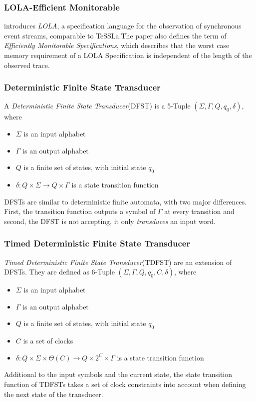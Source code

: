 	\subsubsection{LOLA-Efficient Monitorable}
		\cite{LOLA} introduces \textit{LOLA}, a specification language for the observation of synchronous event streams, comparable to TeSSLa.The paper also defines the term of \textit{Efficiently Monitorable Specifications}, which describes that the worst case memory requirement of a LOLA Specification is independent of the length of the observed trace.
	
	
	\subsubsection{Deterministic Finite State Transducer\cite{Berstel1979}}
		A \textit{Deterministic Finite State Transducer}(DFST) is a 5-Tuple $(\Sigma, \Gamma, Q, q_0, \delta)$, where
		\begin{itemize}
			\item
				$\Sigma$ is an input alphabet
			\item
				$\Gamma$ is an output alphabet
			\item
				$Q$ is a finite set of states, with initial state $q_0$
			\item
				$\delta:Q\times\Sigma\rightarrow Q\times\Gamma$ is a state transition function 
		\end{itemize}
		DFSTs are similar to deterministic finite automata, with two major differences. First, the transition function outputs a symbol of $\Gamma$ at every transition and second, the DFST is not accepting, it only \textit{transduces} an input word.
		
	\subsubsection{Timed Deterministic Finite State Transducer}
		\textit{Timed Deterministic Finite State Transducer}(TDFST) are an extension of DFSTs. They are defined as 6-Tuple $(\Sigma, \Gamma, Q, q_0, C, \delta)$, where
		\begin{itemize}
			\item
				$\Sigma$ is an input alphabet
			\item
				$\Gamma$ is an output alphabet
			\item
				$Q$ is a finite set of states, with initial state $q_0$
			\item
				$C$ is a set of clocks
			\item
				$\delta:Q\times\Sigma\times\Theta(C)\rightarrow Q\times 2^C\times\Gamma$ is a state transition function 
		\end{itemize}
		Additional to the input symbols and the current state, the state transition function of TDFSTs takes a set of clock constraints into account when defining the next state of the transducer.
	
